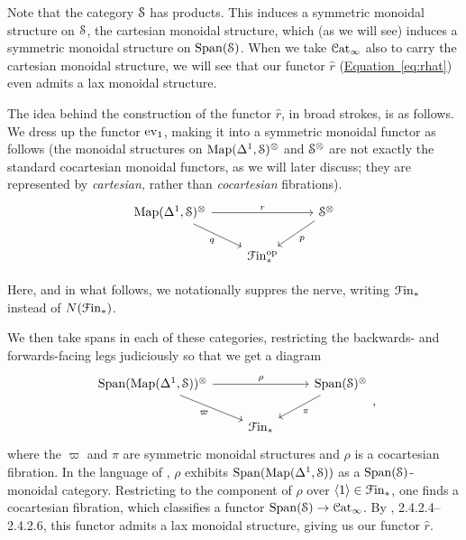 \documentclass[main.tex]{subfiles}
\begin{document}
Note that the category $\S$ has products. This induces a symmetric monoidal structure on $\S$, the cartesian monoidal structure, which (as we will see) induces a symmetric monoidal structure on $\Span(\S)$. When we take $\Cat_{\infty}$ also to carry the cartesian monoidal structure, we will see that our functor $\hat{r}$ (\hyperref[eq:rhat]{Equation~\ref*{eq:rhat}}) even admits a lax monoidal structure.

The idea behind the construction of the functor $\hat{r}$, in broad strokes, is as follows. We dress up the functor $\ev_{1}$, making it into a symmetric monoidal functor as follows (the monoidal structures on $\Map(\Delta^{1}, \S)^{\otimes}$ and $\S^{\otimes}$ are not exactly the standard cocartesian monoidal functors, as we will later discuss; they are represented by \emph{cartesian,} rather than \emph{cocartesian} fibrations).
\begin{equation}
  \label{eq:wishlist_prq}
  \begin{tikzcd}
    \Map(\Delta^{1}, \S)^{\otimes}
    \arrow[rr, "r"]
    \arrow[dr, swap, "q"]
    && \S^{\otimes}
    \arrow[dl, "p"]
    \\
    & \Finp\op
  \end{tikzcd}
\end{equation}

\begin{note}
  Here, and in what follows, we notationally suppres the nerve, writing $\Finp$ instead of $N(\Finp)$.
\end{note}

We then take spans in each of these categories, restricting the backwards- and forwards-facing legs judiciously so that we get a diagram
\begin{equation}
  \label{eq:wishlist_pivarpirho}
  \begin{tikzcd}
    \Span(\Map(\Delta^{1}, \S))^{\otimes}
    \arrow[rr, "\rho"]
    \arrow[dr, swap, "\varpi"]
    && \Span(\S)^{\otimes}
    \arrow[dl, "\pi"]
    \\
    & \Finp
  \end{tikzcd},
\end{equation}
where the $\varpi$ and $\pi$ are symmetric monoidal structures and $\rho$ is a cocartesian fibration. In the language of \cite{luriehigheralgebra}, $\rho$ exhibits $\Span(\Map(\Delta^{1}, \S))$ as a $\Span(\S)$-monoidal category. Restricting to the component of $\rho$ over $\langle 1 \rangle \in \Finp$, one finds a cocartesian fibration, which classifies a functor $\Span(\S) \to \ICat$. By \cite{luriehigheralgebra}, 2.4.2.4--2.4.2.6, this functor admits a lax monoidal structure, giving us our functor $\hat{r}$.
\end{document}
